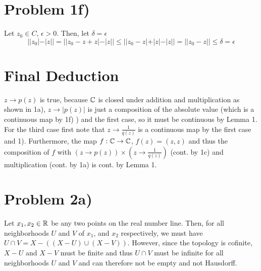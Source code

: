 \section*{Problem 1f)}
Let $z_0\in C$, $\epsilon>0$. Then, let $\delta = \epsilon$
\[ ||z_0|-|z|| = ||z_0-z+z|-|z|| \leq  ||z_0-z| + |z|- |z||=||z_0-z||\leq \delta = \epsilon \]
\section*{Final Deduction}
$z\to p(z)$ is true, because $\mathbb{C}$ is closed under addition and multiplication as shown in 1a), $z\to |p(z)|$ is just a composition of the absolute value (which is a continuous map by 1f) ) and the first case, so it must be continuous by Lemma 1. For the third case first note that $z\to \frac{1}{q(z)}$ is a continuous map by the first case and 1). Furthermore, the map $f: \mathbb{C} \to \mathbb{C}$, $f(z)=(z,z)$ and thus the composition of $f$ with $(z\to p(z))\times(z\to\frac{1}{q(z)})$ (cont. by 1c) and multiplication (cont. by 1a) is cont. by Lemma 1. 
\section*{Problem 2a)}
Let $x_1, x_2 \in \mathbb{R}$ be any two points on the real number line. Then, for all neighborhoods $U$ and $V$ of $x_1$, and $x_2$ respectively, we must have $U \cap V = X-((X-U)\cup(X-V))$. However, since the topology is cofinite, $X-U$ and $X-V$ must be finite and thus $U \cap V$ must be infinite for all neighborhoods $U$ and $V$ and can therefore not be empty and not Hausdorff.
